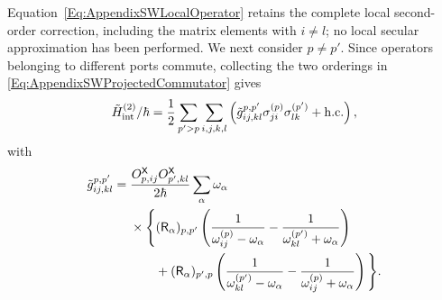 \documentclass[prx,aps,twocolumn,article]{revtex4-2}
\newcommand{\msf}[1]{\mathsf{#1}}
\newcommand{\hc}{\mathrm{h.c.}}
\newcommand{\msX}{\msf{X}}
\newcommand{\msR}{\msf{R}}
\begin{document}
Equation~\eqref{Eq:AppendixSWLocalOperator} retains the complete local
second-order correction, including the matrix elements with $i\neq l$;
no local secular approximation has been performed.
We next consider $p\neq p'$. Since operators belonging to different ports
commute, collecting the two orderings in
\cref{Eq:AppendixSWProjectedCommutator} gives
\begin{align}
    \tilde{H}_{\rm int}^{(2)}/\hbar
    =
    \frac12
    \sum_{p'>p}
    \sum_{i,j,k,l}
    \left(
        \tilde{g}_{ij,kl}^{p,p'}
        \sigma_{ji}^{(p)}
        \sigma_{lk}^{(p')}
        +
        \hc
    \right),
\label{Eq:DiscreteInteractionSW}
\end{align}
with
\begin{align}
    \tilde{g}_{ij,kl}^{p,p'}
    ={}&
    \frac{
        O_{p,ij}^{\msX}
        O_{p',kl}^{\msX}
    }{2\hbar}
    \sum_\alpha
    \omega_\alpha\label{Eq:AppendixSWMediatedResidueCoefficient}
    \\
    &\times
    \Bigg\{
        (\msR_\alpha)_{p,p'}
        \left(
            \frac{1}{
                \omega_{ij}^{(p)}
                -
                \omega_\alpha
            }
            -
            \frac{1}{
                \omega_{kl}^{(p')}
                +
                \omega_\alpha
            }
        \right)\nonumber
        \\
        &\hspace{7mm}
        +
        (\msR_\alpha)_{p',p}
        \left(
            \frac{1}{
                \omega_{kl}^{(p')}
                -
                \omega_\alpha
            }
            -
            \frac{1}{
                \omega_{ij}^{(p)}
                +
                \omega_\alpha
            }
        \right)
    \Bigg\}.\nonumber
\end{align}
\end{document}
